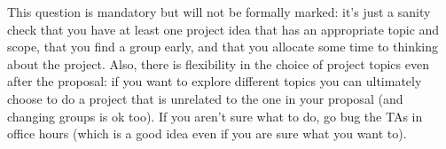 \documentclass{article}
\def\blu#1{{\color{blu}#1}}
\begin{document}
\blu{This question is mandatory but will not be formally marked: it's just a sanity check that you have at least one project idea that has an appropriate topic and scope, that you find a group early, and that you  allocate some time to thinking about the project.} 
Also, there is flexibility in the choice of project topics even after the proposal: if you want to explore different topics you can ultimately choose to do a project that is unrelated to the one in your proposal (and changing groups is ok too). If you aren't sure what to do, go bug the TAs in office hours (which is a good idea even if you are sure what you want to).
\end{document}
